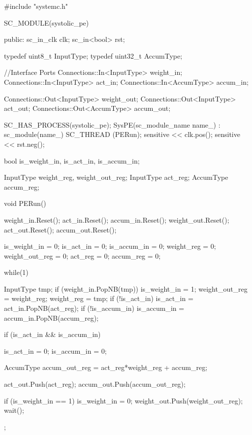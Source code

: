 \begin{codeblock}[language=c++]
#include "systemc.h"

SC_MODULE(systolic_pe){
  public:
  sc_in_clk   clk;
  sc_in<bool> rst;

  typedef uint8_t   InputType;
  typedef uint32_t  AccumType;

  //Interface Ports
  Connections::In<InputType>    weight_in;
  Connections::In<InputType>    act_in;
  Connections::In<AccumType>    accum_in;

  Connections::Out<InputType>  weight_out;
  Connections::Out<InputType>  act_out;
  Connections::Out<AccumType>  accum_out;

  SC_HAS_PROCESS(systolic_pe);
  SysPE(sc_module_name name_) : sc_module(name_) {
    SC_THREAD (PERun);
    sensitive << clk.pos();
    sensitive << rst.neg();
  }

  bool is_weight_in, is_act_in, is_accum_in;

  InputType weight_reg, weight_out_reg;
  InputType act_reg;
  AccumType accum_reg;

  void PERun() {
    weight_in.Reset();
    act_in.Reset();
    accum_in.Reset();
    weight_out.Reset();
    act_out.Reset();
    accum_out.Reset();
    
    is_weight_in = 0;
    is_act_in = 0;
    is_accum_in = 0;
    weight_reg = 0;
    weight_out_reg = 0;
    act_reg = 0;
    accum_reg = 0;
  
    while(1) {
      InputType tmp;
      if (weight_in.PopNB(tmp)){
        is_weight_in = 1;
        weight_out_reg = weight_reg;
        weight_reg = tmp;
      }
      if (!is_act_in) {
        is_act_in = act_in.PopNB(act_reg);
      }
      if (!is_accum_in) {
        is_accum_in = accum_in.PopNB(accum_reg);
      }
    
      if (is_act_in && is_accum_in) {
        is_act_in = 0;
        is_accum_in = 0;

        AccumType accum_out_reg = act_reg*weight_reg + accum_reg;

        act_out.Push(act_reg);
        accum_out.Push(accum_out_reg);
      }
      if (is_weight_in == 1) {
        is_weight_in = 0;
        weight_out.Push(weight_out_reg);
      }
      wait();
    }
  }


};


\end{codeblock}


